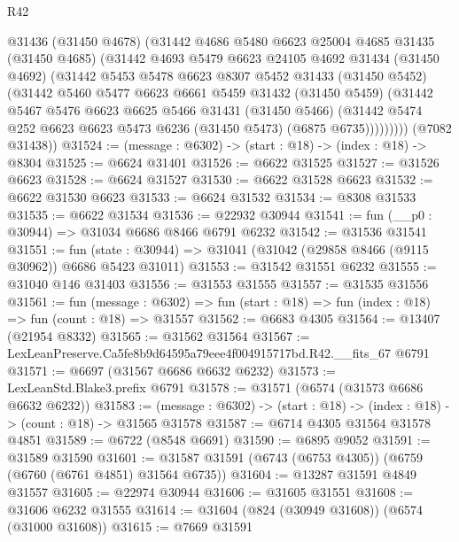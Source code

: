 \begin{lexlean}{R42}
\begin{coremodule}
{          @31436
          (@31450 @4678)
          (@31442
            @4686
            @5480
            @6623
            @25004
            @4685
            @31435
            (@31450 @4685)
            (@31442
              @4693
              @5479
              @6623
              @24105
              @4692
              @31434
              (@31450 @4692)
              (@31442
                @5453
                @5478
                @6623
                @8307
                @5452
                @31433
                (@31450 @5452)
                (@31442
                  @5460
                  @5477
                  @6623
                  @6661
                  @5459
                  @31432
                  (@31450 @5459)
                  (@31442
                    @5467
                    @5476
                    @6623
                    @6625
                    @5466
                    @31431
                    (@31450 @5466)
                    (@31442 @5474 @252 @6623 @6623 @5473 @6236 (@31450 @5473) (@6875 @6735)))))))))
      (@7082 @31438))
@31524 := (message : @6302) -> (start : @18) -> (index : @18) -> @8304
@31525 := @6624 @31401
@31526 := @6622 @31525
@31527 := @31526 @6623
@31528 := @6624 @31527
@31530 := @6622 @31528 @6623
@31532 := @6622 @31530 @6623
@31533 := @6624 @31532
@31534 := @8308 @31533
@31535 := @6622 @31534
@31536 := @22932 @30944
@31541 := fun (__p0 : @30944) => @31034 @6686 @8466 @6791 @6232
@31542 := @31536 @31541
@31551 := fun (state : @30944) => @31041 (@31042 (@29858 @8466 (@9115 @30962)) @6686 @5423 @31011)
@31553 := @31542 @31551 @6232
@31555 := @31040 @146 @31403
@31556 := @31553 @31555
@31557 := @31535 @31556
@31561 := fun (message : @6302) =>
  fun (start : @18) => fun (index : @18) => fun (count : @18) => @31557
@31562 := @6683 @4305
@31564 := @13407 (@21954 @8332)
@31565 := @31562 @31564
@31567 := LexLeanPreserve.Ca5fe8b9d64595a79eee4f004915717bd.R42.__fits_67 @6791
@31571 := @6697 (@31567 @6686 @6632 @6232)
@31573 := LexLeanStd.Blake3.prefix @6791
@31578 := @31571 (@6574 (@31573 @6686 @6632 @6232))
@31583 := (message : @6302) -> (start : @18) -> (index : @18) -> (count : @18) -> @31565 @31578
@31587 := @6714 @4305 @31564 @31578 @4851
@31589 := @6722 (@8548 @6691)
@31590 := @6895 @9052
@31591 := @31589 @31590
@31601 := @31587 @31591 (@6743 (@6753 @4305)) (@6759 (@6760 (@6761 @4851) @31564 @6735))
@31604 := @13287 @31591 @4849 @31557
@31605 := @22974 @30944
@31606 := @31605 @31551
@31608 := @31606 @6232 @31555
@31614 := @31604 (@824 (@30949 @31608)) (@6574 (@31000 @31608))
@31615 := @7669 @31591
}
\end{coremodule}
\end{lexlean}

